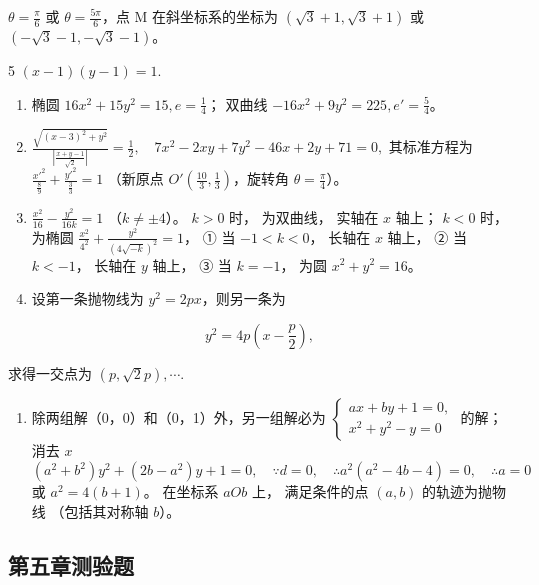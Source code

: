 \(\theta=\frac{\pi}{6}\) 或 \(\theta=\frac{5\pi}{6}\)，点 M
在斜坐标系的坐标为 \((\sqrt{3}+1,\sqrt{3}+1)\) 或
\((-\sqrt{3}-1,-\sqrt{3}-1)\)。

5 \((x - 1)(y - 1) = 1.\)

\begin{enumerate}
\def\labelenumi{\arabic{enumi}.}
\setcounter{enumi}{5}
\item
  椭圆 \(16x^{2} + 15y^{2} = 15, e = \frac{1}{4}\)； 双曲线
  \(-16x^{2} + 9y^{2} = 225, e' = \frac{5}{4}\)。
\item
  \(\frac{\sqrt{(x-3)^2 + y^2}}{\left|\frac{x+y-1}{\sqrt{2}}\right|} = \frac{1}{2}, \quad 7x^2 - 2xy + 7y^2 - 46x + 2y + 71 = 0,\)
  其标准方程为
  \(\frac{x'^2}{\frac{8}{9}} + \frac{y'^2}{\frac{3}{3}} = 1\) （新原点
  \(O' \left( \frac{10}{3}, \frac{1}{3} \right)\)，旋转角
  \(\theta = \frac{\pi}{4}\)）。
\item
  \(\frac{x^2}{16} - \frac{y^2}{16k} = 1\) （\(k \neq \pm 4\)）。
  \(k > 0\) 时， 为双曲线， 实轴在 \(x\) 轴上； \(k < 0\) 时， 为椭圆
  \(\frac{x^2}{4^2} + \frac{y^2}{(4\sqrt{-k})^2} = 1\)， ① 当
  \(-1 < k < 0\)， 长轴在 \(x\) 轴上， ② 当 \(k < -1\)， 长轴在 \(y\)
  轴上， ③ 当 \(k = -1\)， 为圆 \(x^2 + y^2 = 16\)。
\item
  设第一条抛物线为 \(y^{2} = 2px\)，则另一条为
\end{enumerate}

\[
y^{2} = 4 p \left(x - \frac {p}{2}\right),
\]

求得一交点为 \((p,\sqrt{2}p),\cdots.\)

\begin{enumerate}
\def\labelenumi{\arabic{enumi}.}
\setcounter{enumi}{9}
\tightlist
\item
  除两组解（0，0）和（0，1）外，另一组解必为
  \(\left\{ \begin{array}{l} ax + by + 1 = 0, \\ x^2 + y^2 - y = 0 \end{array} \right.\)
  的解；消去 \(x\)
  \((a^{2}+b^{2})y^{2}+(2b-a^{2})y+1=0,\quad\because d=0,\quad\therefore a^{2}(a^{2}-4b-4)=0,\quad\therefore a=0\)
  或 \(a^{2}=4(b+1)\)。 在坐标系 \(aOb\) 上， 满足条件的点 \((a,b)\)
  的轨迹为抛物线 （包括其对称轴 \(b\)）。
\end{enumerate}

\subsection{第五章测验题}\label{ux7b2cux4e94ux7ae0ux6d4bux9a8cux9898-1}


